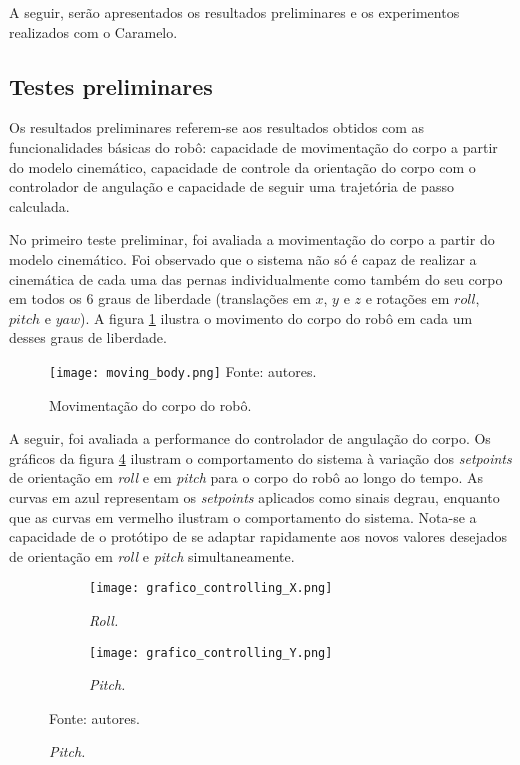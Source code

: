 \documentclass[../main.tex]{subfiles}
\begin{document}
  A seguir, serão apresentados os resultados preliminares e os experimentos realizados com o Caramelo. 
  
  \subsection{Testes preliminares}
  \label{subsec:testes_preliminares}
  
  Os resultados preliminares referem-se aos resultados obtidos com as funcionalidades básicas do robô: capacidade de movimentação do corpo a partir do modelo cinemático, capacidade de controle da orientação do corpo com o controlador de angulação e capacidade de seguir uma trajetória de passo calculada.

  No primeiro teste preliminar, foi avaliada a movimentação do corpo a partir do modelo cinemático. Foi observado que o sistema não só é capaz de realizar a cinemática de cada uma das pernas individualmente como também do seu corpo em todos os 6 graus de liberdade (translações em $x$, $y$ e $z$ e rotações em $roll$, $pitch$ e $yaw$). A figura \ref{fig:moving_body} ilustra o movimento do corpo do robô em cada um desses graus de liberdade.

  \begin{figure}[!htb]
    \centering
    \caption{Movimentação do corpo do robô.}
    \texttt{[image: moving\_body.png]}
    Fonte: autores.
    \label{fig:moving_body}
  \end{figure}

  \vspace{-\parskip}
  A seguir, foi avaliada a performance do controlador de angulação do corpo. Os gráficos da figura \ref{fig:grafico_controlling} ilustram o comportamento do sistema à variação dos \textit{setpoints} de orientação em \textit{roll} e em \textit{pitch} para o corpo do robô ao longo do tempo. As curvas em azul representam os \textit{setpoints} aplicados como sinais degrau, enquanto que as curvas em vermelho ilustram o comportamento do sistema. Nota-se a capacidade de o protótipo de se adaptar rapidamente aos novos valores desejados de orientação em \textit{roll} e \textit{pitch} simultaneamente.

  \begin{figure}
    \centering
    \caption{Respostas dos controles de angulação.}
    \begin{subfigure}[t]{0.48\textwidth}
      \centering
      \texttt{[image: grafico\_controlling\_X.png]}
      \caption{\textit{Roll.}}
      \label{fig:controlling_roll}
    \end{subfigure}
    \begin{subfigure}[t]{0.48\textwidth}
      \centering
      \texttt{[image: grafico\_controlling\_Y.png]}
      \caption{\textit{Pitch.}}
      \label{fig:controlling_pitch}
    \end{subfigure}
    Fonte: autores.
    \label{fig:grafico_controlling}
    \vspace{-\baselineskip}
  \end{figure}
\end{document}
